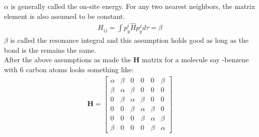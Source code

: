 \documentclass[9pt,twocolumn,twoside]{optica}
\begin{document}
$\alpha$ is generally called the on-site energy. For any two nearest neighbors, the matrix element is also assumed to be constant. 
\begin{align}
 H_{ij}=\int p_y ^{i} \hat{H}  p_y ^{j} d\tau =\beta
 \label{eq:pHij}
\end{align}
$\beta$ is called the resonance integral and this assumption holds good as long as the   bond is the remains the same.\\
After the above assumptions as made the \textbf{H} matrix for a molecule say -benzene with 6 carbon atoms looks something like:
\begin{align}
\textbf{H}=
\begin{bmatrix}
    \alpha & \beta & 0 & 0 & 0 & \beta\\
    \beta & \alpha & \beta & 0 & 0 & 0\\
    0 & \beta & \alpha & \beta & 0 & 0\\
    0 & 0 & \beta & \alpha & \beta & 0\\
    0 & 0 & 0 & \beta & \alpha & \beta\\
    \beta & 0 & 0 & 0 & \beta & \alpha
\end{bmatrix}
 \label{eq:pHmat}
\end{align}
\end{document}
